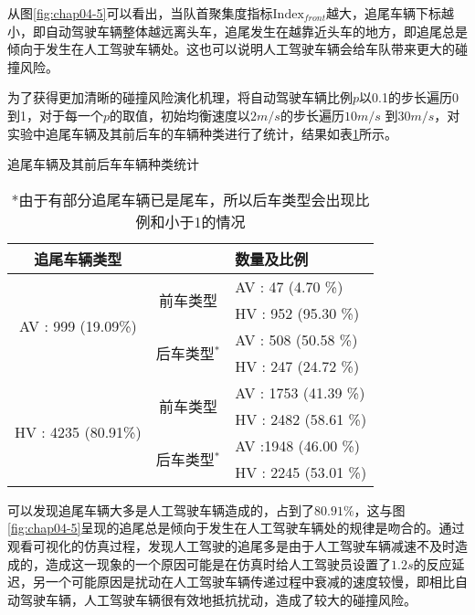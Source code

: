 从图\ref{fig:chap04-5}可以看出，当队首聚集度指标$\mathrm{Index}_{front}$越大，追尾车辆下标越小，即自动驾驶车辆整体越远离头车，追尾发生在越靠近头车的地方，即追尾总是倾向于发生在人工驾驶车辆处。这也可以说明人工驾驶车辆会给车队带来更大的碰撞风险。

为了获得更加清晰的碰撞风险演化机理，将自动驾驶车辆比例$p$以0.1的步长遍历0到1，对于每一个$p$的取值，初始均衡速度以$2m/s$的步长遍历$10m/s$
到$30m/s$，对实验中追尾车辆及其前后车的车辆种类进行了统计，结果如表\ref{tab:chap04-2}所示。

\begin{table}
    \centering
    \caption{追尾车辆及其前后车车辆种类统计}
    \begin{tabular}{ccl}
      \toprule
      追尾车辆类型                 &                                &  数量及比例  \\
      \midrule
      \multirow{4}{*}{AV : 999 (19.09\%)}         &    \multirow{2}{*}{前车类型}    &   AV : 47 (4.70 \%)    \\
                                 &                                       &   HV : 952 (95.30 \%)   \\
      \cline{2-3}
                                 &    \multirow{2}{*}{后车类型$^*$}    &   AV : 508 (50.58 \%)    \\
                                 &                                &   HV : 247 (24.72 \%)   \\       
      \hline
      \multirow{4}{*}{HV : 4235 (80.91\%)}        &    \multirow{2}{*}{前车类型}    &   AV : 1753 (41.39 \%)    \\
                                 &                                &   HV : 2482 (58.61 \%)  \\      
      \cline{2-3}
                                 &    \multirow{2}{*}{后车类型$^*$}    &   AV :1948 (46.00 \%)  \\
                                 &                                &   HV : 2245 (53.01 \%)  \\     
      \bottomrule
    \end{tabular}
    \caption*{*由于有部分追尾车辆已是尾车，所以后车类型会出现比例和小于1的情况}
    \label{tab:chap04-2}
  \end{table}

可以发现追尾车辆大多是人工驾驶车辆造成的，占到了$80.91\%$，这与图\ref{fig:chap04-5}呈现的追尾总是倾向于发生在人工驾驶车辆处的规律是吻合的。通过观看可视化的仿真过程，发现人工驾驶的追尾多是由于人工驾驶车辆减速不及时造成的，造成这一现象的一个原因可能是在仿真时给人工驾驶员设置了$1.2s$的反应延迟，另一个可能原因是扰动在人工驾驶车辆传递过程中衰减的速度较慢，即相比自动驾驶车辆，人工驾驶车辆很有效地抵抗扰动，造成了较大的碰撞风险。

